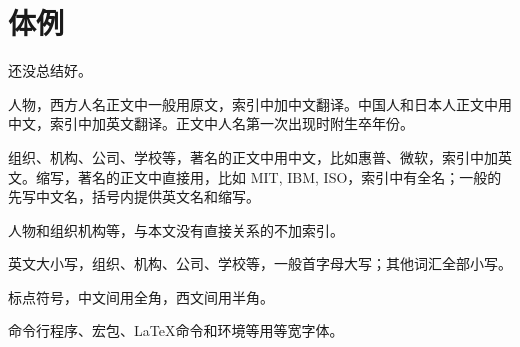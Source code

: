 \section*{体例}

还没总结好。

\begin{compactenum}
    \item 人物，西方人名正文中一般用原文，索引中加中文翻译。中国人和日本人正文中用中文，索引中加英文翻译。正文中人名第一次出现时附生卒年份。
    \item 组织、机构、公司、学校等，著名的正文中用中文，比如惠普、微软，索引中加英文。缩写，著名的正文中直接用，比如 MIT, IBM, ISO，索引中有全名；一般的先写中文名，括号内提供英文名和缩写。
    \item 人物和组织机构等，与本文没有直接关系的不加索引。
    \item 英文大小写，组织、机构、公司、学校等，一般首字母大写；其他词汇全部小写。
    \item 标点符号，中文间用全角，西文间用半角。
    \item 命令行程序、宏包、\LaTeX 命令和环境等用等宽字体。
\end{compactenum}
